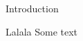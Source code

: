 
\begin{frame}[t,plain]
\titlepage
\end{frame}

\begin{frame}[t]{Introduction}

\end{frame}

\begin{frame}[fragile]{Lalala}
	Some text
\end{frame}
